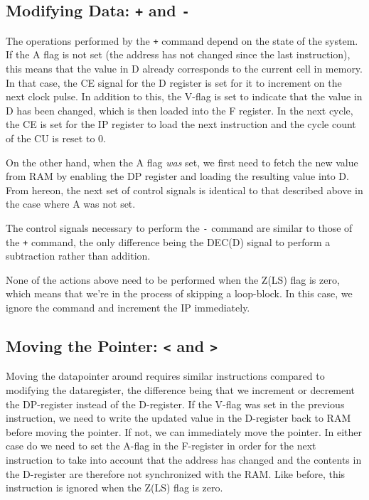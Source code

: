 \subsection{Modifying Data: \texttt{+} and \texttt{-}}
The operations performed by the \texttt{+} command depend on the state of the system. If the A flag is not set (the address has not changed since the last instruction), this means that the value in D already corresponds to the current cell in memory. In that case, the CE signal for the D register is set for it to increment on the next clock pulse. In addition to this, the V-flag is set to indicate that the value in D has been changed, which is then loaded into the F register. In the next cycle, the CE is set for the IP register to load the next instruction and the cycle count of the CU is reset to 0.

On the other hand, when the A flag \emph{was} set, we first need to fetch the new value from RAM by enabling the DP register and loading the resulting value into D. From hereon, the next set of control signals is identical to that described above in the case where A was not set.

The control signals necessary to perform the \texttt{-} command are similar to those of the \texttt{+} command, the only difference being the DEC(D) signal to perform a subtraction rather than addition.

None of the actions above need to be performed when the Z(LS) flag is zero, which means that we're in the process of skipping a loop-block. In this case, we ignore the command and increment the IP immediately.

\subsection{Moving the Pointer: \texttt{<} and \texttt{>}}
Moving the datapointer around requires similar instructions compared to modifying the dataregister, the difference being that we increment or decrement the DP-register instead of the D-register. If the V-flag was set in the previous instruction, we need to write the updated value in the D-register back to RAM before moving the pointer. If not, we can immediately move the pointer. In either case do we need to set the A-flag in the F-register in order for the next instruction to take into account that the address has changed and the contents in the D-register are therefore not synchronized with the RAM. Like before, this instruction is ignored when the Z(LS) flag is zero.

